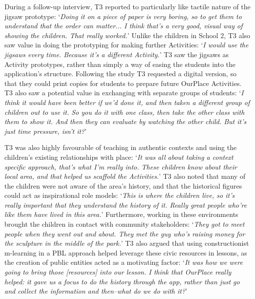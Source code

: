 \documentclass[,hyphens]{sigchi}
\begin{document}
During a follow-up interview, T3 reported to particularly like tactile nature of the jigsaw prototype: `\textit{Doing it on a piece of paper is very boring, so to get them to understand that the order can matter... I think that's a very good, visual way of showing the children. That really worked.}' Unlike the children in School 2, T3 also saw value in doing the prototyping for making further Activities: `\textit{I would use the jigsaws every time. Because it's a different Activity.}' T3 saw the jigsaws as Activity prototypes, rather than simply a way of easing the students into the application's structure. Following the study T3 requested a digital version, so that they could print copies for students to prepare future OurPlace Activities. T3 also saw a potential value in exchanging with separate groups of students: `\textit{I think it would have been better if we'd done it, and then taken a different group of children out to use it. So you do it with one class, then take the other class with them to show it. And then they can evaluate by watching the other child. But it's just time pressure, isn't it?}'

T3 was also highly favourable of teaching in authentic contexts and using the children's existing relationships with place: `\textit{It was all about taking a context specific approach, that's what I'm really into. These children know about their local area, and that helped us scaffold the Activities.}' T3 also noted that many of the children were not aware of the area's history, and that the historical figures could act as inspirational role models: `\textit{This is where the children live, so it's really important that they understand the history of it. Really great people who're like them have lived in this area.}' Furthermore, working in these environments brought the children in contact with community stakeholders: `\textit{They got to meet people when they went out and about. They met the guy who's raising money for the sculpture in the middle of the park.}' T3 also argued that using constructionist m-learning in a PBL approach helped leverage these civic resources in lessons, as the creation of public entities acted as a motivating factor: `\textit{It was how we were going to bring those [resources] into our lesson. I think that OurPlace really helped: it gave us a focus to do the history through the app, rather than just go and collect the information and then--what do we do with it?}' 
\end{document}
